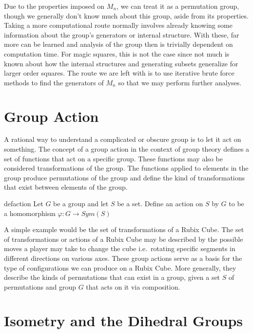 \documentclass[12pt]{report}
\begin{document}
\par Due to the properties imposed on $M_n$, we can treat it as a permutation group, though we
generally don't know much about this group, aside from its properties. Taking a more computational
route normally involves already knowing some information about the group's generators or internal
structure. With these, far more can be learned and analysis of the group then is trivially
dependent on computation time. For magic squares, this is not the case since not much is known
about how the internal structures and generating subsets generalize for larger order squares. The
route we are left with is to use iterative brute force methods to find the generators of $M_n$ so
that we may perform further analyses.

\section{Group Action}

\par A rational way to understand a complicated or obscure group is to let it act on something. The
concept of a group action in the context of group theory defines a set of functions that act on a
specific group. These functions may also be considered transformations of the group. The functions
applied to elements in the group produce permutations of the group and define the kind of
transformations that exist between elements of the group.

\singlespacing{}
\begin{defbox}{}{defaction}
  Let $G$ be a group and let $S$ be a set. Define an action on $S$ by $G$ to be a homomorphism
  $\varphi:G\rightarrow Sym\left(S\right)$
\end{defbox}
\doublespacing{}

A simple example would be the set of transformations of a Rubix Cube. The set of transformations or
actions of a Rubix Cube may be described by the possible moves a player may take to change the cube
i.e.\ rotating specific segments in different directions on various axes. These group actions serve
as a basis for the type of configurations we can produce on a Rubix Cube. More generally, they
describe the kinds of permutations that can exist in a group, given a set $S$ of permutations and
group $G$ that acts on it via composition.

\section{Isometry and the Dihedral Groups}
\end{document}
